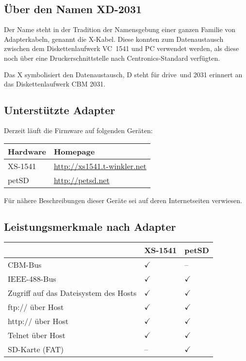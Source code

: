 \documentclass[10pt,a4paper]{scrartcl}		%
\begin{document}
\subsection{Über den Namen \glqq XD-2031\grqq}
Der Name steht in der Tradition der Namensgebung einer ganzen Familie
von Adapterkabeln, genannt die X-Kabel. Diese konnten zum 
Datenaustausch zwischen dem Diskettenlaufwerk \mbox{VC 1541} 
und PC verwendet werden, als diese noch über eine
Druckerschnittstelle nach Centronics-Standard verfügten.

Das X symbolisiert den Datenaustausch, D steht für \glqq drive\grqq\ 
und 2031 erinnert an das Diskettenlaufwerk CBM 2031.

\subsection{Unterstützte Adapter}
Derzeit läuft die Firmware auf folgenden Geräten:

\begin{tabular}[c]{l l}
\toprule 
Hardware & Homepage \\
\midrule
XS-1541	& \url{http://xs1541.t-winkler.net} \\
petSD	& \url{http://petsd.net} \\
\bottomrule
\end{tabular}

Für nähere Beschreibungen dieser Geräte sei auf deren Internetseiten
verwiesen.

\subsection*{Leistungsmerkmale nach Adapter}

\begin{tabular}[c]{l l l}
\toprule
			& XS-1541	& petSD			\\
\midrule
CBM-Bus			& $\checkmark$	& -- 			\\
IEEE-488-Bus		& $\checkmark$	& $\checkmark$		\\
Zugriff auf das Dateisystem
des Hosts		& $\checkmark$	& $\checkmark$		\\
ftp:// über Host	& $\checkmark$	& $\checkmark$		\\
http:// über Host	& $\checkmark$	& $\checkmark$		\\
Telnet über Host	& $\checkmark$	& $\checkmark$		\\
SD-Karte (FAT)		& --		& $\checkmark$		\\
\bottomrule
\end{tabular}
\end{document}
